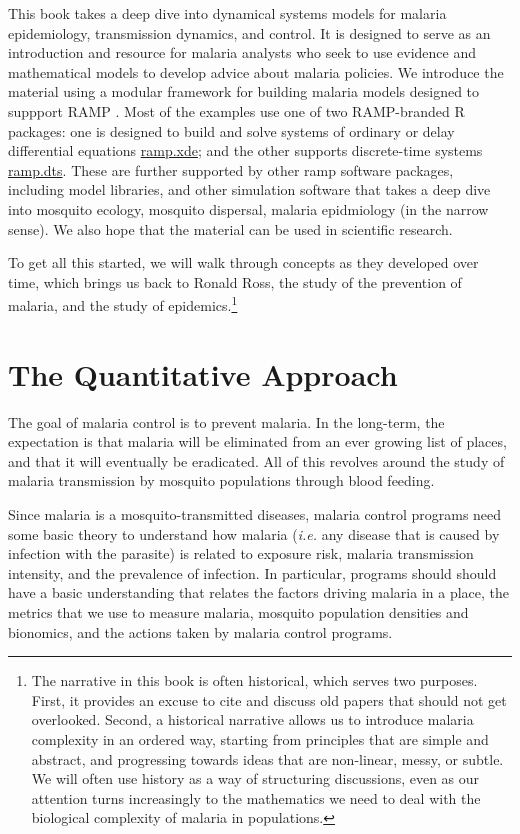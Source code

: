 \documentclass[
]{book}
\begin{document}
This book takes a deep dive into dynamical systems models for malaria epidemiology, transmission dynamics, and control. It is designed to serve as an introduction and resource for malaria analysts who seek to use evidence and mathematical models to develop advice about malaria policies. We introduce the material using a modular framework for building malaria models designed to suppport RAMP \autocite{WuSL2023SpatialDynamics}. Most of the examples use one of two RAMP-branded R packages: one is designed to build and solve systems of ordinary or delay differential equations \href{https://dd-harp.github.io/ramp.xde/}{ramp.xde}; and the other supports discrete-time systems \href{https://dd-harp.github.io/ramp.dts/}{ramp.dts}. These are further supported by other ramp software packages, including model libraries, and other simulation software that takes a deep dive into mosquito ecology, mosquito dispersal, malaria epidmiology (in the narrow sense). We also hope that the material can be used in scientific research.

To get all this started, we will walk through concepts as they developed over time, which brings us back to Ronald Ross, the study of the prevention of malaria, and the study of epidemics.\footnote{The narrative in this book is often historical, which serves two purposes.
  First, it provides an excuse to cite and discuss old papers that should not get overlooked.
  Second, a historical narrative allows us to introduce malaria complexity in an ordered way, starting from principles that are simple and abstract, and progressing towards ideas that are non-linear, messy, or subtle.
  We will often use history as a way of structuring discussions, even as our attention turns increasingly to the mathematics we need to deal with the biological complexity of malaria in populations.}

\section{The Quantitative Approach}\label{the-quantitative-approach}

The goal of malaria control is to prevent malaria. In the long-term, the expectation is that malaria will be eliminated from an ever growing list of places, and that it will eventually be eradicated.
All of this revolves around the study of malaria transmission by mosquito populations through blood feeding.

Since malaria is a mosquito-transmitted diseases, malaria control programs need some basic theory to understand how malaria (\emph{i.e.} any disease that is caused by infection with the parasite) is related to exposure risk, malaria transmission intensity, and the prevalence of infection.
In particular, programs should should have a basic understanding that relates the factors driving malaria in a place, the metrics that we use to measure malaria, mosquito population densities and bionomics, and the actions taken by malaria control programs.
\end{document}
